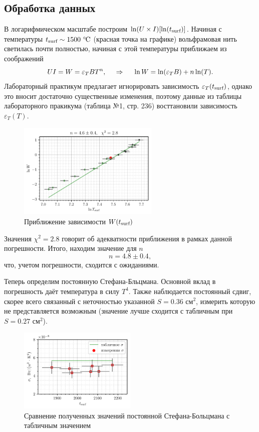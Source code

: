 \newpage
\subsection*{Обработка данных}


В логарифмическом масштабе построим $\ln(U \times  I)[\ln(t_{\textnormal{surf}})]$. Начиная с температуры $t_{\textnormal{surf}} \sim 1500 \ ^\circ\hspace{-1pt}\textnormal{C}$ (красная точка на графике) вольфрамовая нить светилась почти полностью, начиная с этой температуры приближаем из соображений
\begin{equation*}
    UI = W = \varepsilon_T B T^n, 
    \hspace{0.5cm} \Rightarrow \hspace{0.5cm}
    \ln W = \ln(\varepsilon_T B) + n \ln (T).
\end{equation*}
Лабораторный практикум предлагает игнорировать зависимость $\varepsilon_T (t_{\textnormal{surf}})$, однако это вносит достаточно существенные изменения, поэтому данные из таблицы лабораторного пракикума (таблица №1, стр. 236) восттановили зависимость $\varepsilon_T (T)$.  
\vspace{-5mm}

\begin{figure}[h]
    \centering
    \includegraphics[width=0.6\textwidth]{figs/fig2.pdf}
    \vspace{-5mm}
    \caption{Приближение зависимости $W(t_{\textnormal{surf}})$}
    \label{fig:plot}
\end{figure}


Значения $\chi^2 = 2.8$ говорит об адекватности приближения в рамках данной погрешности. 
Итого, находим значение для $n$
\begin{equation*}
    n = 4.8 \pm 0.4,
\end{equation*}
что, учетом погрешности, сходится с ожиданиями. 

Теперь определим постоянную Стефана-Бльцмана. Основной вклад в погрешность даёт температура в силу $T^4$. Также наблюдается постоянный сдвиг, скорее всего связанный с неточностью указанной $S = 0.36 \text{ см}^2$, измерить которую не представляется возможным (значение лучше сходится с табличным при $S = 0.27 \text{ см}^2$). 

\begin{figure}[h]
    \centering
    \includegraphics[width=0.5\textwidth]{figs/fig3.pdf}
    \vspace{-5mm}
    \caption{Сравнение полученных значений постоянной Стефана-Больцмана с табличным значением}
\end{figure}
